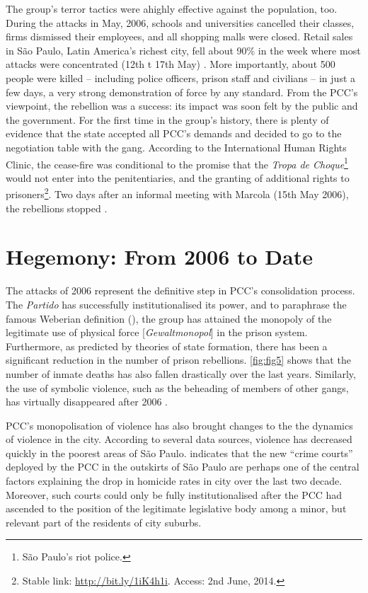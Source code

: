 The group's terror tactics were ahighly effective against the population, too. During the attacks in May, 2006, schools and universities cancelled their classes, firms dismissed their employees, and all shopping malls were closed. Retail sales in S\~{a}o Paulo, Latin America's richest city, fell about 90\% in the week where most attacks were concentrated (12th t 17th May) \citep[]{uol2006pcc}. More importantly, about 500 people were killed -- including police officers, prison staff and civilians -- in just a few days, a very strong demonstration of force by any standard. From the PCC's viewpoint, the rebellion was a success: its impact was soon felt by the public and the government. For the first time in the group's history, there is plenty of evidence that the state accepted all PCC's demands and decided to go to the negotiation table with the gang. According to the International Human Rights Clinic, the cease-fire was conditional to the promise that the \textit{Tropa de Choque}\footnote{S\~{a}o Paulo's riot police.} would not enter into the penitentiaries, and the granting of additional rights to prisoners\footnote{Stable link: \href{http://bit.ly/1iK4h1i}{http://bit.ly/1iK4h1i}. Access: 2nd June, 2014.}. Two days after an informal meeting with Marcola (15th May 2006), the rebellions stopped \citep{folha2006fimataques}. 

\section{Hegemony: From 2006 to Date}

The attacks of 2006 represent the definitive step in PCC's consolidation process. The \textit{Partido} has successfully institutionalised its power, and to paraphrase the famous Weberian definition (\citeyear{weber1919politik}), the group has attained the monopoly of the legitimate use of physical force [\textit{Gewaltmonopol}] in the prison system. Furthermore, as predicted by theories of state formation, there has been a significant reduction in the number of prison rebellions. \autoref{fig:fig5} shows that the number of inmate deaths has also fallen drastically over the last years. Similarly, the use of symbolic violence, such as the beheading of members of other gangs, has virtually disappeared after 2006 \citep[166]{dias2011pulverizaccao}. 

PCC's monopolisation of violence has also brought changes to the the dynamics of violence in the city. According to several data sources, violence has decreased quickly in the poorest areas of S\~{a}o Paulo. \citet[]{de2010crime} indicates that the new ``crime courts'' deployed by the PCC in the outskirts of S\~{a}o Paulo are perhaps one of the central factors explaining the drop in homicide rates in city over the last two decade. Moreover, such courts could only be fully institutionalised after the PCC had ascended to the position of the legitimate legislative body among a minor, but relevant part of the residents of city suburbs.

